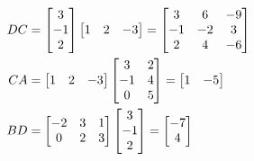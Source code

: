 \documentclass[handout]{ximera}
\begin{document}
\begin{exercise}
\begin{exercise}
\begin{align*}
DC &= \begin{bmatrix} 3\\  -1\\ 2  \end{bmatrix}
	\begin{bmatrix}  1  &   2 &   -3\end{bmatrix}
	= \begin{bmatrix}  {3}  &   {6}  &  {-9}\\
  {-1}  & {-2}   & {3}\\   {2}  &  {4}   & {-6} \end{bmatrix} \\
CA &= \begin{bmatrix}  1  &   2 &   -3\end{bmatrix}
	\begin{bmatrix}  3   &  2\\   -1  &  4\\   0   &  5 \end{bmatrix}
	= \begin{bmatrix}    {1} &   {-5}  \end{bmatrix} \\
BD &= \begin{bmatrix}   -2  &  3  &  1\\  0  &  2  &  3 \end{bmatrix}
	\begin{bmatrix} 3\\  -1\\ 2  \end{bmatrix}
	= \begin{bmatrix}  {-7} \\ {4}  \end{bmatrix}
\end{align*}


\end{exercise}
\end{exercise}
\end{document}
